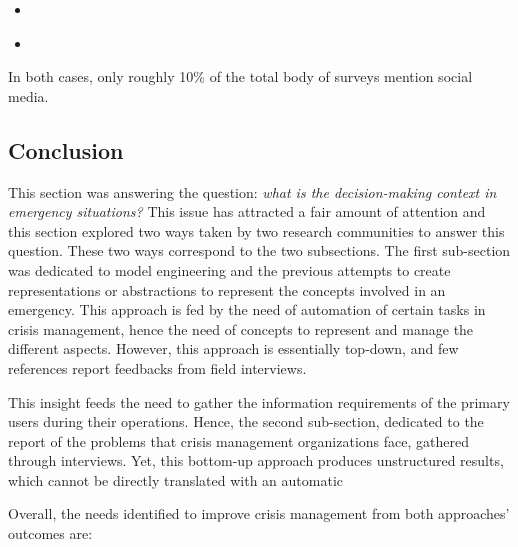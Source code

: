 \begin{itemize}
    \item \textcite{cobbDesigningDelugeUnderstanding2014}
    \item \textcite{tapiaTrustworthyTweetDeeper2013}
\end{itemize}

In both cases, only roughly 10\% of the total body of surveys mention social media.

\subsection*{Conclusion}
This section was answering the question: \emph{what is the decision-making context in emergency situations?}
This issue has attracted a fair amount of attention and this section explored two ways taken by two research communities to answer this question.
These two ways correspond to the two subsections.
The first sub-section was dedicated to model engineering and the previous attempts to create representations
or abstractions to represent the concepts involved in an emergency.
This approach is fed by the need of automation of certain tasks in crisis management, hence the need of concepts to represent and manage the different aspects.
However, this approach is essentially top-down, and few references report feedbacks from field interviews.

This insight feeds the need to gather the information requirements of the primary users during their operations.
Hence, the second sub-section, dedicated to the report of the problems that crisis management organizations face, gathered through interviews.
Yet, this bottom-up approach produces unstructured results, which cannot be directly translated with an automatic

Overall, the needs identified to improve crisis management from both approaches' outcomes are:

